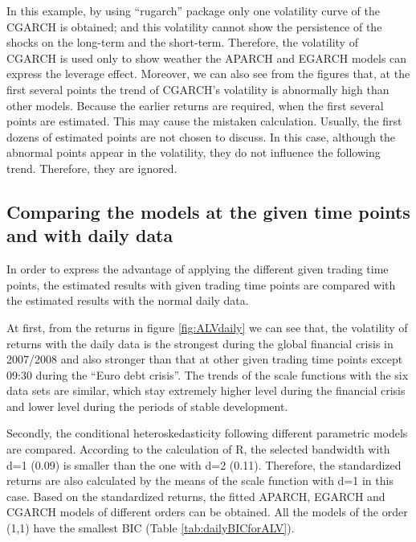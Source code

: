In this example, by using ``rugarch'' package only one volatility curve of the CGARCH is obtained; and this volatility cannot show the persistence of the shocks on the long-term and the short-term. Therefore, the volatility of CGARCH is used only to show weather the APARCH and EGARCH models can express the leverage effect. Moreover, we can also see from the figures that, at the first several points the trend of CGARCH's volatility is abnormally high than other models. Because the earlier returns are required, when the first several points are estimated. This may cause the mistaken calculation. Usually, the first dozens of estimated points are not chosen to discuss. In this case, although the abnormal points appear in the volatility, they do not influence the following trend. Therefore, they are ignored.



\subsection{Comparing the models at the given time points and with daily data}

In order to express the advantage of applying the different given trading time points, the estimated results with given trading time points are compared with the estimated results with the normal daily data.

At first, from the returns in figure \ref{fig:ALVdaily} we can see that, the volatility of returns with the daily data is the strongest during the global financial crisis in 2007/2008 and also stronger than that at other given trading time points except 09:30 during the ``Euro debt crisis''. The trends of the scale functions with the six data sets are similar, which stay extremely higher level during the financial crisis and lower level during the periods of stable development.


Secondly, the conditional heteroskedasticity following different parametric models are compared. According to the calculation of R, the selected bandwidth with d=1 (0.09) is smaller than the one with d=2 (0.11). Therefore, the standardized returns are also calculated by the means of the scale function with d=1 in this case. Based on the standardized returns, the fitted APARCH, EGARCH and CGARCH models of different orders can be obtained. All the models of the order (1,1) have the smallest BIC (Table \ref{tab:dailyBICforALV}).




